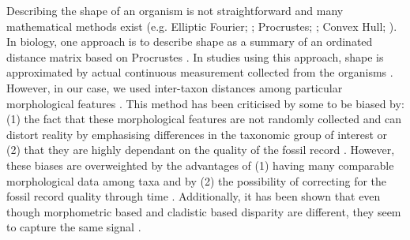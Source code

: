 Describing the shape of an organism is not straightforward and many mathematical methods exist (e.g. Elliptic Fourier; \citealt{Fourier1982}; Procrustes; \citealt{JamesRohlf1993129}; Convex Hull; \citealt{ANDREW1979216}). %
In biology, one approach is to describe shape as a summary of an ordinated distance matrix based on Procrustes %
 \citep[i.e. a geometric morphometric approach][]{zelditch2012geometric}.
In studies using this approach, shape is approximated by actual continuous measurement collected from the organisms \citep[e.g.][]{friedmanexplosive2010,hopkinsdecoupling2013,finlay2015morphological}.
However, in our case, we used inter-taxon distances among particular morphological features \citep[e.g.][]{foote1997evolution,Wills2001,Wesley-Hunt2005}.
This method has been criticised by some to be biased by: (1) the fact that these morphological features are not randomly collected and can distort reality by emphasising differences in the taxonomic group of interest \citep{Hopkins24032015} or (2) that they are highly dependant on the quality of the fossil record \citep{Butler2012}.
However, these biases are overweighted by the advantages of (1) having many comparable morphological data among taxa \citep{Brusatte12092008} and by (2) the possibility of correcting for the fossil record quality through time \citep{Butler2012}.
Additionally, it has been shown that even though morphometric based and cladistic based disparity are different, they seem to capture the same signal \citep{foth2012different,hetherington2015cladistic}.

